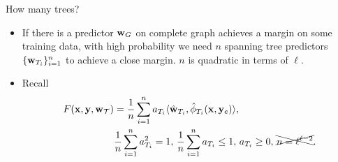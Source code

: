 \documentclass[first=dgreen,second=purple,logo=yellowexc]{aaltoslides}
\begin{document}
%
\begin{frame}{How many trees?}
	\begin{itemize}\footnotesize
		\item If there is a predictor $\mathbf {w}_G$ on complete graph achieves a margin on some training data, with high probability we need $n$ spanning tree predictors $\{\mathbf {w}_{T_i}\}_{i=1}^n$ to achieve a close margin. $n$ is quadratic in terms of $\ell$.
		\item Recall
		\begin{align*}
			F(\mathbf {x},\mathbf {y},\mathbf {w}_{\mathcal{T}}) &= \frac{1}{n}\sum_{i = 1}^{n}a_{T_i}\langle \hat{\mathbf {w}}_{T_i}, \hat{\phi}_{T_i}(\mathbf {x},\mathbf {y}_e) \rangle,\\
			& \frac{1}{n}\sum_{i = 1}^{n}a_{T_i}^2=1, \, \frac{1}{n}\sum_{i = 1}^{n}a_{T_i}\le1,\, a_{T_i}\ge0,\, \xcancel{n=\ell^{\ell-2}}.
		\end{align*}
	\end{itemize}
\end{frame}
\end{document}
